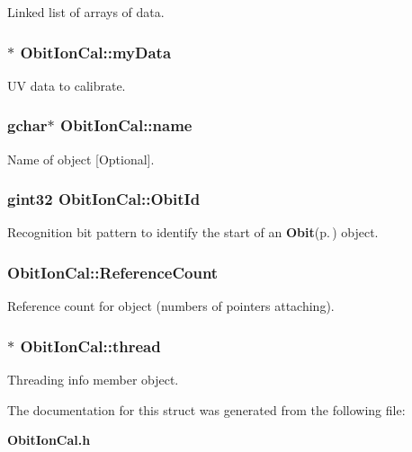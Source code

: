Linked list of arrays of data. 

\subsubsection{$\ast$ {\bf Obit\-Ion\-Cal::my\-Data}}\label{structObitIonCal_o7}


UV data to calibrate. 

\subsubsection{\setlength{\rightskip}{0pt plus 5cm}gchar$\ast$ {\bf Obit\-Ion\-Cal::name}}\label{structObitIonCal_o3}


Name of object [Optional]. 

\subsubsection{\setlength{\rightskip}{0pt plus 5cm}gint32 {\bf Obit\-Ion\-Cal::Obit\-Id}}\label{structObitIonCal_o0}


Recognition bit pattern to identify the start of an {\bf Obit}{\rm (p.\,\pageref{structObit})} object. 

\subsubsection{ {\bf Obit\-Ion\-Cal::Reference\-Count}}\label{structObitIonCal_o2}


Reference count for object (numbers of pointers attaching). 

\subsubsection{$\ast$ {\bf Obit\-Ion\-Cal::thread}}\label{structObitIonCal_o4}


Threading info member object. 



The documentation for this struct was generated from the following file:\begin{CompactItemize}
\item 
{\bf Obit\-Ion\-Cal.h}\end{CompactItemize}
